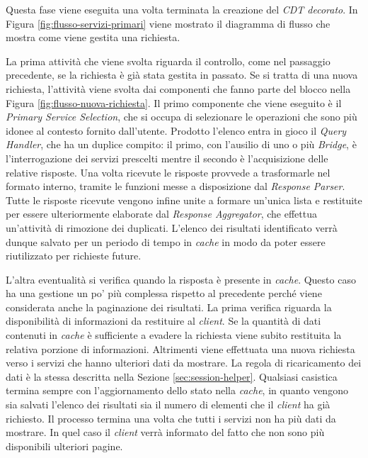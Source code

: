 Questa fase viene eseguita una volta terminata la creazione del \emph{CDT decorato}. In Figura \ref{fig:flusso-servizi-primari} viene mostrato il diagramma di flusso che mostra come viene gestita una richiesta.

La prima attività che viene svolta riguarda il controllo, come nel passaggio precedente, se la richiesta è già stata gestita in passato. Se si tratta di una nuova richiesta, l'attività viene svolta dai componenti che fanno parte del blocco  nella Figura \ref{fig:flusso-nuova-richiesta}. Il primo componente che viene eseguito è il \emph{Primary Service Selection}, che si occupa di selezionare le operazioni che sono più idonee al contesto fornito dall'utente. Prodotto l'elenco entra in gioco il \emph{Query Handler}, che ha un duplice compito: il primo, con l'ausilio di uno o più \emph{Bridge}, è l'interrogazione dei servizi prescelti mentre il secondo è l'acquisizione delle relative risposte. Una volta ricevute le risposte provvede a trasformarle nel formato interno, tramite le funzioni messe a disposizione dal \emph{Response Parser}. Tutte le risposte ricevute vengono infine unite a formare un'unica lista e restituite per essere ulteriormente elaborate dal \emph{Response Aggregator}, che effettua un'attività di rimozione dei duplicati. L'elenco dei risultati identificato verrà dunque salvato per un periodo di tempo in \emph{cache} in modo da poter essere riutilizzato per richieste future.

L'altra eventualità si verifica quando la risposta è presente in \emph{cache}. Questo caso ha una gestione un po' più complessa rispetto al precedente perché viene considerata anche la paginazione dei risultati. La prima verifica riguarda la disponibilità di informazioni da restituire al \emph{client}. Se la quantità di dati contenuti in \emph{cache} è sufficiente a evadere la richiesta viene subito restituita la relativa porzione di informazioni. Altrimenti viene effettuata una nuova richiesta verso i servizi che hanno ulteriori dati da mostrare. La regola di ricaricamento dei dati è la stessa descritta nella Sezione \ref{sec:session-helper}. Qualsiasi casistica termina sempre con l'aggiornamento dello stato nella \emph{cache}, in quanto vengono sia salvati l'elenco dei risultati sia il numero di elementi che il \emph{client} ha già richiesto. Il processo termina una volta che tutti i servizi non ha più dati da mostrare. In quel caso il \emph{client} verrà informato del fatto che non sono più disponibili ulteriori pagine.

